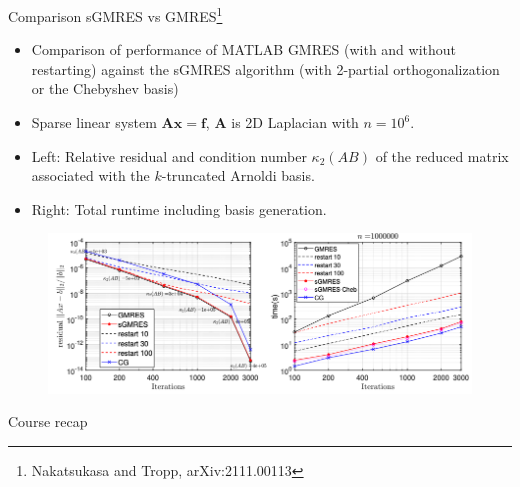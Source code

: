 \documentclass{beamer}
\newcommand{\bvec}[1]{\mathbf{#1}}
\newcommand{\vf}{\bvec{f}}
\newcommand{\vx}{\bvec{x}}
\newcommand{\vA}{\bvec{A}}
\newcommand{\bitem}{\item[$\bullet$]}
\begin{document}
\begin{frame}{Comparison sGMRES vs GMRES\footnote{Nakatsukasa and Tropp, arXiv:2111.00113}}
\begin{footnotesize}
\begin{itemize}
    \bitem Comparison of performance of MATLAB GMRES (with and without restarting) against the sGMRES algorithm (with 2-partial
orthogonalization or the Chebyshev basis)
\bitem Sparse linear system $\vA\vx = \vf$, $\vA$ is 2D Laplacian with $n = 10^6$.
\bitem Left: Relative residual and condition number $\kappa_2(AB)$ of the
reduced matrix associated with the $k$-truncated Arnoldi basis. 
\bitem Right: Total runtime including basis
generation. 
\end{itemize}
\end{footnotesize}

\begin{figure}
    \centering
    \includegraphics[width=.9\textwidth]{Graphics/GMRESvsSGMRES.png}
\end{figure}
    
\end{frame}

\begin{frame}{}
    \begin{center}
        Course recap     
    \end{center}
\end{frame}
\end{document}
